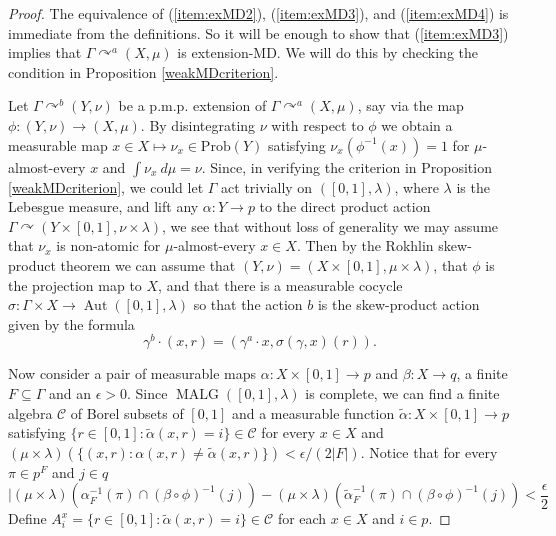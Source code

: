 \documentclass[12pt]{amsart}
\theoremstyle{definition}
\def\cal{\mathcal}
\DeclareMathOperator{\Aut}{Aut}
\def \Malg{\operatorname{MALG}}
\newcommand{\pmp}{p{$.$}m{$.$}p{$.$}}
\newcommand{\acts}{\curvearrowright}
\newcommand{\Prob}{\mathrm{Prob}}
\begin{document}
\begin{proof}
    The equivalence of (\ref{item:exMD2}), (\ref{item:exMD3}), and (\ref{item:exMD4}) is immediate from the definitions. So it will be enough to show that (\ref{item:exMD3}) implies that $\Gamma \acts^a (X, \mu)$ is extension-MD. We will do this by checking the condition in Proposition \ref{weakMDcriterion}.

    Let $\Gamma \acts^b (Y, \nu)$ be a {\pmp} extension of $\Gamma \acts^a (X, \mu)$, say via the map $\phi : (Y, \nu) \rightarrow (X, \mu)$. By disintegrating $\nu$ with respect to $\phi$ we obtain a measurable map $x \in X \mapsto \nu_x \in \Prob(Y)$ satisfying $\nu_x(\phi^{-1}(x)) = 1$ for $\mu$-almost-every $x$ and $\int \nu_x \ d \mu = \nu$. Since, in verifying the criterion in Proposition \ref{weakMDcriterion}, we could let $\Gamma$ act trivially on $([0, 1], \lambda)$, where $\lambda$ is the Lebesgue measure, and lift any $\alpha : Y \to p$ to the direct product action $\Gamma \acts (Y \times [0,1], \nu \times \lambda)$, we see that without loss of generality we may assume that $\nu_x$ is non-atomic for $\mu$-almost-every $x \in X$. Then by the Rokhlin skew-product theorem we can assume that $(Y, \nu) = (X \times [0,1], \mu \times \lambda)$, that $\phi$ is the projection map to $X$, and that there is a measurable cocycle $\sigma : \Gamma \times X \rightarrow \Aut([0,1], \lambda)$ so that the action $b$ is the skew-product action given by the formula
	\[\gamma^b \cdot (x, r) = (\gamma^a \cdot x, \sigma(\gamma, x)(r)).\]

    Now consider a pair of measurable maps $\alpha : X \times [0,1] \rightarrow p$ and $\beta : X \rightarrow q$, a finite $F \subseteq \Gamma$ and an $\epsilon > 0$. Since $\Malg([0,1], \lambda)$ is complete, we can find a finite algebra $\cal C$ of Borel subsets of $[0,1]$ and a measurable function $\tilde \alpha : X \times [0,1] \rightarrow p$ satisfying $\{r \in [0,1] : \tilde \alpha(x,r) = i\} \in \cal C$ for every $x \in X$ and $(\mu \times \lambda)(\{(x,r) : \alpha(x,r) \neq \tilde \alpha(x,r)\}) < \epsilon / (2|F|)$. Notice that for every $\pi \in p^F$ and $j \in q$
    \begin{equation} \label{eqn:exMD1}
        |(\mu \times \lambda)(\alpha_F^{-1}(\pi) \cap (\beta \circ \phi)^{-1}(j)) - (\mu \times \lambda)(\tilde \alpha_F^{-1}(\pi) \cap (\beta \circ \phi)^{-1}(j)) < \frac{\epsilon}{2}
    \end{equation}
    Define $A_i^x = \{r \in [0,1] : \tilde \alpha(x,r) = i\} \in \cal C$ for each $x \in X$ and $i \in p$.


\end{proof}
\end{document}
